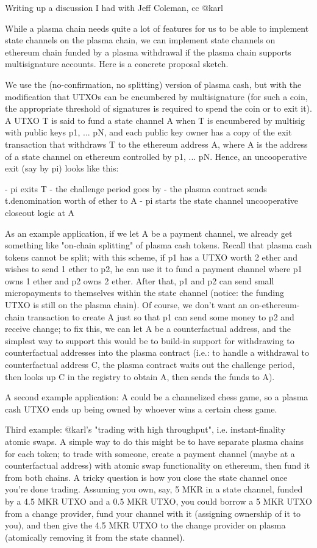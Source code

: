 \documentclass{article}
\begin{document}
Writing up a discussion I had with Jeff Coleman, cc @karl

While a plasma chain needs quite a lot of features for us to be able to implement state channels on the plasma chain, we can implement state channels on ethereum chain funded by a plasma withdrawal if the plasma chain supports multisignature accounts. Here is a concrete proposal sketch.

We use the (no-confirmation, no splitting) version of plasma cash, but with the modification that UTXOs can be encumbered by multisignature (for such a coin, the appropriate threshold of signatures is required to spend the coin or to exit it). A UTXO T is said to fund a state channel A when T is encumbered by multisig with public keys p1, ... pN, and each public key owner has a copy of the exit transaction that withdraws T to the ethereum address A, where A is the address of a state channel on ethereum controlled by p1, ... pN. Hence, an uncooperative exit (say by pi) looks like this:

- pi exits T
- the challenge period goes by
- the plasma contract sends t.denomination worth of ether to A
- pi starts the state channel uncooperative closeout logic at A

As an example application, if we let A be a payment channel, we already get something like "on-chain splitting" of plasma cash tokens. Recall that plasma cash tokens cannot be split; with this scheme, if p1 has a UTXO worth 2 ether and wishes to send 1 ether to p2, he can use it to fund a payment channel where p1 owns 1 ether and p2 owns 2 ether. After that, p1 and p2 can send small micropayments to themselves within the state channel (notice: the funding UTXO is still on the plasma chain). Of course, we don't want an on-ethereum-chain transaction to create A just so that p1 can send some money to p2 and receive change; to fix this, we can let A be a counterfactual address, and the simplest way to support this would be to build-in support for withdrawing to counterfactual addresses into the plasma contract (i.e.: to handle a withdrawal to counterfactual address C, the plasma contract waits out the challenge period, then looks up C in the registry to obtain A, then sends the funds to A).

A second example application: A could be a channelized chess game, so a plasma cash UTXO ends up being owned by whoever wins a certain chess game.

Third example: @karl's "trading with high throughput", i.e. instant-finality atomic swaps. A simple way to do this might be to have separate plasma chains for each token; to trade with someone, create a payment channel (maybe at a counterfactual address) with atomic swap functionality on ethereum, then fund it from both chains. A tricky question is how you close the state channel once you're done trading. Assuming you own, say, 5 MKR in a state channel, funded by a 4.5 MKR UTXO and a 0.5 MKR UTXO, you could borrow a 5 MKR UTXO from a change provider, fund your channel with it (assigning ownership of it to you), and then give the 4.5 MKR UTXO to the change provider on plasma (atomically removing it from the state channel).
\end{document}
